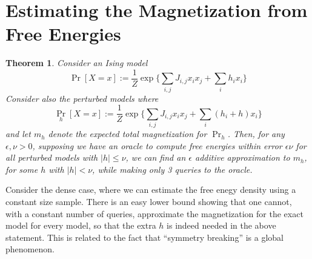 \documentclass[final, 12pt]{colt2018}
\newtheorem{theorem}{Theorem}[section]
\theoremstyle{definition}
\theoremstyle{plain}
\begin{document}
\section{Estimating the Magnetization from Free Energies }\label{appendix-magnetization-proof}
\begin{theorem}\label{thm-approx-magnetization}
Consider an Ising model %
\[
\Pr[X=x]:=\frac{1}{Z}\exp\{\sum_{i,j}J_{i,j}x_{i}x_{j} + \sum_i h_i x_i\}
\]
Consider also the perturbed models where
\[
\Pr_{h}[X=x]:=\frac{1}{Z}\exp\{\sum_{i,j}J_{i,j}x_{i}x_{j} + \sum_i (h_i+h) x_i\}
\]
and let $m_h$ denote the expected total magnetization for $\Pr_{h}$. Then, for any $\epsilon,\nu > 0$, supposing we have an oracle to compute free energies within error $\epsilon \nu$ for all perturbed models with $|h| \le \nu$, we can find an $\epsilon$ additive approximation to $m_h$, for some $h$ with $|h| < \nu$,
while making only 3 queries to the oracle. 
\end{theorem}
Consider the dense case, where we can estimate the free enegy density using a constant size sample.
There is an easy lower bound showing that one cannot, with a constant number of queries, approximate the magnetization for the exact model for every model, so that the extra $h$ is indeed needed in the above statement. 
This is related to the fact that ``symmetry breaking'' is a global phenomenon.  
\end{document}
